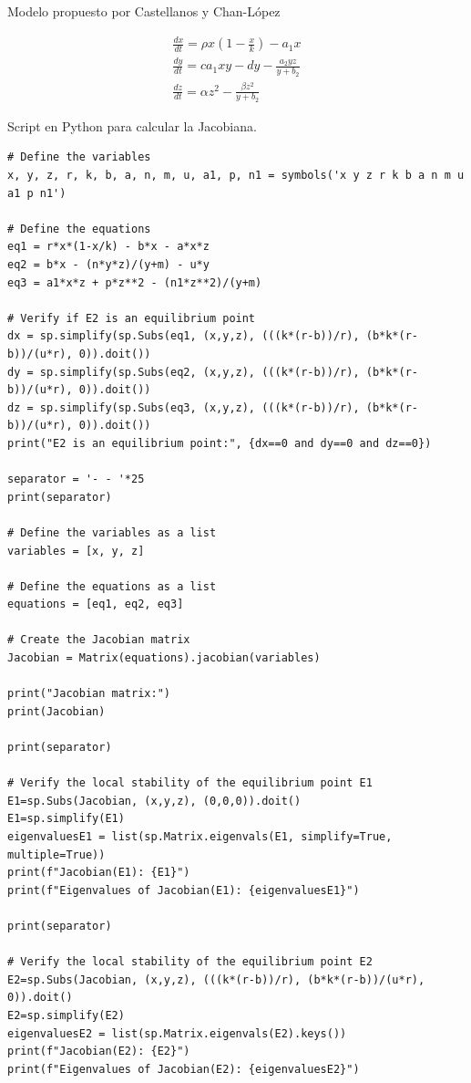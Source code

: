 \documentclass{wscpaperproc}
\theoremstyle{wsc}
\begin{document}
\begin{center}
	Modelo propuesto por Castellanos y Chan-López
\end{center}
\begin{equation} \label{Holling1y2_Castellanos}
	\begin{gathered}
		\frac{d x}{d t}=\rho x\left(1-\frac{x}{k}\right)-a_1 x \\
		\frac{d y}{d t}=c a_1 x y-d y-\frac{a_2 y z}{y+b_2} \\
		\frac{d z}{d t}=\alpha z^2-\frac{\beta z^2}{y+b_2}
	\end{gathered}
\end{equation}

\begin{center}
	Script en Python para calcular la Jacobiana.
\end{center}
\begin{verbatim}
# Define the variables
x, y, z, r, k, b, a, n, m, u, a1, p, n1 = symbols('x y z r k b a n m u a1 p n1')

# Define the equations
eq1 = r*x*(1-x/k) - b*x - a*x*z
eq2 = b*x - (n*y*z)/(y+m) - u*y
eq3 = a1*x*z + p*z**2 - (n1*z**2)/(y+m)

# Verify if E2 is an equilibrium point
dx = sp.simplify(sp.Subs(eq1, (x,y,z), (((k*(r-b))/r), (b*k*(r-b))/(u*r), 0)).doit())
dy = sp.simplify(sp.Subs(eq2, (x,y,z), (((k*(r-b))/r), (b*k*(r-b))/(u*r), 0)).doit())
dz = sp.simplify(sp.Subs(eq3, (x,y,z), (((k*(r-b))/r), (b*k*(r-b))/(u*r), 0)).doit())
print("E2 is an equilibrium point:", {dx==0 and dy==0 and dz==0})

separator = '- - '*25
print(separator)

# Define the variables as a list
variables = [x, y, z]

# Define the equations as a list
equations = [eq1, eq2, eq3]

# Create the Jacobian matrix
Jacobian = Matrix(equations).jacobian(variables)

print("Jacobian matrix:")
print(Jacobian)

print(separator)

# Verify the local stability of the equilibrium point E1
E1=sp.Subs(Jacobian, (x,y,z), (0,0,0)).doit()
E1=sp.simplify(E1)
eigenvaluesE1 = list(sp.Matrix.eigenvals(E1, simplify=True, multiple=True))
print(f"Jacobian(E1): {E1}")
print(f"Eigenvalues of Jacobian(E1): {eigenvaluesE1}")

print(separator)

# Verify the local stability of the equilibrium point E2
E2=sp.Subs(Jacobian, (x,y,z), (((k*(r-b))/r), (b*k*(r-b))/(u*r), 0)).doit()
E2=sp.simplify(E2)
eigenvaluesE2 = list(sp.Matrix.eigenvals(E2).keys())
print(f"Jacobian(E2): {E2}")
print(f"Eigenvalues of Jacobian(E2): {eigenvaluesE2}")
\end{verbatim}
\label{Jacobian}
\end{document}
